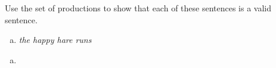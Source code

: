 \documentclass[../main.tex]{subfiles}
\begin{document}
Use the set of productions to show that each of these sentences is a valid sentence.
\begin{enumerate}[a)]
	\item {\it the happy hare runs}
\end{enumerate}

\solution
\begin{enumerate}[a)]
	\item 
\end{enumerate}
\end{document}
